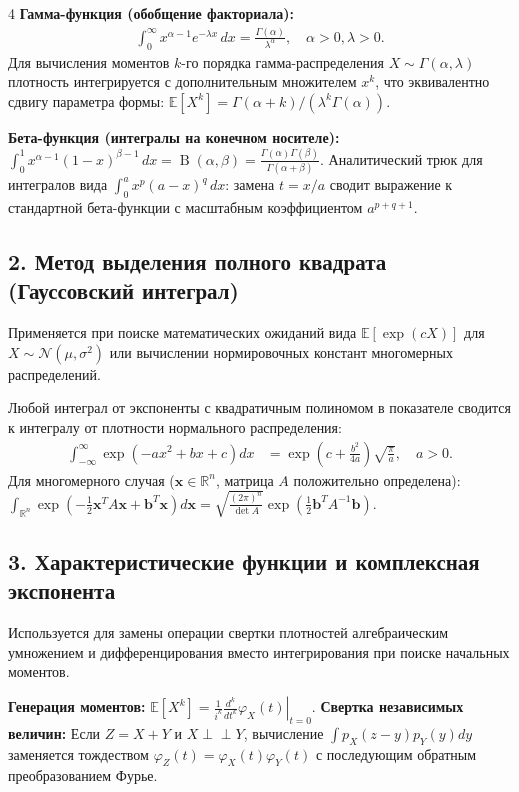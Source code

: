 \documentclass[a4paper, landscape]{article}
\newcommand{\E}{\mathbb{E}}
\newcommand{\N}{\mathcal{N}}
\begin{document}
\begin{multicols*}{4}
\textbf{Гамма-функция (обобщение факториала):}
\begin{gather*}
    \int_0^\infty x^{\alpha-1} e^{-\lambda x} \, dx = \frac{\Gamma(\alpha)}{\lambda^\alpha}, \quad \alpha > 0, \lambda > 0.
\end{gather*}
Для вычисления моментов $k$-го порядка гамма-распределения $X \sim \Gamma(\alpha, \lambda)$ плотность интегрируется с дополнительным множителем $x^k$, что эквивалентно сдвигу параметра формы: $\E[X^k] = \Gamma(\alpha+k) / (\lambda^k \Gamma(\alpha))$.

\textbf{Бета-функция (интегралы на конечном носителе):}
$
    \int_0^1 x^{\alpha-1} (1-x)^{\beta-1} \, dx = \operatorname{B}(\alpha, \beta) = \frac{\Gamma(\alpha)\Gamma(\beta)}{\Gamma(\alpha+\beta)}.
    $
Аналитический трюк для интегралов вида $\int_0^a x^p (a-x)^q \, dx$: замена $t = x/a$ сводит выражение к стандартной бета-функции с масштабным коэффициентом $a^{p+q+1}$.

\subsection*{2. Метод выделения полного квадрата (Гауссовский интеграл)}
Применяется при поиске математических ожиданий вида $\E[\exp(cX)]$ для $X \sim \N(\mu, \sigma^2)$ или вычислении нормировочных констант многомерных распределений.

Любой интеграл от экспоненты с квадратичным полиномом в показателе сводится к интегралу от плотности нормального распределения:
\begin{align*}
    \int_{-\infty}^\infty \exp\left( -ax^2 + bx + c \right) dx &= \exp\left(c + \frac{b^2}{4a}\right) \sqrt{\frac{\pi}{a}}, \quad a > 0.
\end{align*}
Для многомерного случая ($\mathbf{x} \in \mathbb{R}^n$, матрица $A$ положительно определена):
$
    \int_{\mathbb{R}^n} \exp\left( -\frac{1}{2}\mathbf{x}^T A \mathbf{x} + \mathbf{b}^T \mathbf{x} \right) d\mathbf{x} = \sqrt{\frac{(2\pi)^n}{\det A}} \exp\left( \frac{1}{2}\mathbf{b}^T A^{-1} \mathbf{b} \right).
    $

\subsection*{3. Характеристические функции и комплексная экспонента}
Используется для замены операции свертки плотностей алгебраическим умножением и дифференцирования вместо интегрирования при поиске начальных моментов.

\textbf{Генерация моментов:}
$
    \E[X^k] = \left. \frac{1}{i^k} \frac{d^k}{dt^k} \varphi_X(t) \right|_{t=0}.
        $
\textbf{Свертка независимых величин:} Если $Z = X + Y$ и $X \perp\!\!\perp Y$, вычисление $\int p_X(z-y)p_Y(y)dy$ заменяется тождеством $\varphi_Z(t) = \varphi_X(t)\varphi_Y(t)$ с последующим обратным преобразованием Фурье.


\end{multicols*}
\end{document}
